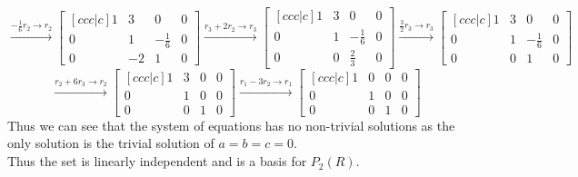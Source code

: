\documentclass{article}
\begin{document}
$$ \xrightarrow{-\frac{1}{6}r_2 \rightarrow r_2} \begin{bmatrix}[ccc|c]
    1 & 3 & 0 & 0\\
    0 & 1 & -\frac{1}{6} & 0\\
    0 & -2 & 1 & 0
\end{bmatrix} \xrightarrow{r_3 + 2r_2 \rightarrow r_3} \begin{bmatrix}[ccc|c]
    1 & 3 & 0 & 0\\
    0 & 1 & -\frac{1}{6} & 0\\
    0 & 0 & \frac{2}{3} & 0
\end{bmatrix}
\xrightarrow{\frac{3}{2}r_3 \rightarrow r_3} \begin{bmatrix}[ccc|c]
    1 & 3 & 0 & 0\\
    0 & 1 & -\frac{1}{6} & 0\\
    0 & 0 & 1 & 0
\end{bmatrix}$$ $$\xrightarrow{r_2 + 6r_3 \rightarrow r_2} \begin{bmatrix}[ccc|c]
    1 & 3 & 0 & 0\\
    0 & 1 & 0 & 0\\
    0 & 0 & 1 & 0
\end{bmatrix} \xrightarrow{r_1 - 3r_2 \rightarrow r_1} \begin{bmatrix}[ccc|c]
    1 & 0 & 0 & 0\\
    0 & 1 & 0 & 0\\
    0 & 0 & 1 & 0
\end{bmatrix}$$
Thus we can see that the system of equations has no non-trivial solutions as the only solution is the trivial solution of $a = b = c = 0$.\\
Thus the set is linearly independent and is a basis for $P_2(R)$.
\end{document}
